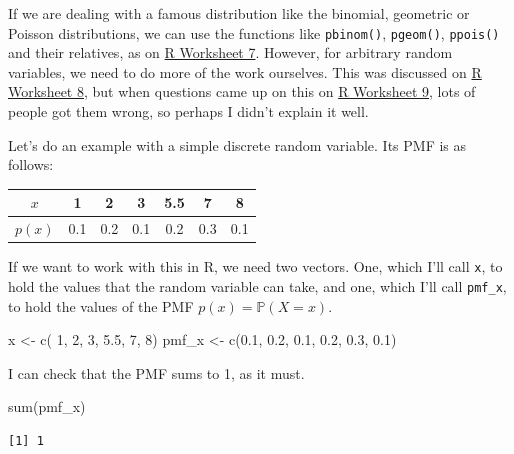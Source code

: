 \documentclass[
  letterpaper,
  DIV=11,
  numbers=noendperiod]{scrreprt}
\newenvironment{Shaded}{\begin{snugshade}}{\end{snugshade}}
\newcommand{\DecValTok}[1]{\textcolor[rgb]{0.68,0.00,0.00}{#1}}
\newcommand{\FloatTok}[1]{\textcolor[rgb]{0.68,0.00,0.00}{#1}}
\newcommand{\FunctionTok}[1]{\textcolor[rgb]{0.28,0.35,0.67}{#1}}
\newcommand{\NormalTok}[1]{\textcolor[rgb]{0.00,0.23,0.31}{#1}}
\newcommand{\OtherTok}[1]{\textcolor[rgb]{0.00,0.23,0.31}{#1}}
\theoremstyle{remark}
\begin{document}
If we are dealing with a famous distribution like the binomial,
geometric or Poisson distributions, we can use the functions like
\texttt{pbinom()}, \texttt{pgeom()}, \texttt{ppois()} and their
relatives, as on \protect\hyperlink{R}{R Worksheet 7}. However, for
arbitrary random variables, we need to do more of the work ourselves.
This was discussed on \protect\hyperlink{R}{R Worksheet 8}, but when
questions came up on this on \protect\hyperlink{R}{R Worksheet 9}, lots
of people got them wrong, so perhaps I didn't explain it well.

Let's do an example with a simple discrete random variable. Its PMF is
as follows:

\begin{longtable}[]{@{}ccccccc@{}}
\toprule()
\(x\) & 1 & 2 & 3 & 5.5 & 7 & 8 \\
\midrule()
\endhead
\(p(x)\) & 0.1 & 0.2 & 0.1 & 0.2 & 0.3 & 0.1 \\
\bottomrule()
\end{longtable}

If we want to work with this in R, we need two vectors. One, which I'll
call \texttt{x}, to hold the values that the random variable can take,
and one, which I'll call \texttt{pmf\_x}, to hold the values of the PMF
\(p(x) = \mathbb P(X = x)\).

\begin{Shaded}
\begin{Highlighting}[]
\NormalTok{x     }\OtherTok{\textless{}{-}} \FunctionTok{c}\NormalTok{(  }\DecValTok{1}\NormalTok{,   }\DecValTok{2}\NormalTok{,   }\DecValTok{3}\NormalTok{, }\FloatTok{5.5}\NormalTok{,   }\DecValTok{7}\NormalTok{,   }\DecValTok{8}\NormalTok{)}
\NormalTok{pmf\_x }\OtherTok{\textless{}{-}} \FunctionTok{c}\NormalTok{(}\FloatTok{0.1}\NormalTok{, }\FloatTok{0.2}\NormalTok{, }\FloatTok{0.1}\NormalTok{, }\FloatTok{0.2}\NormalTok{, }\FloatTok{0.3}\NormalTok{, }\FloatTok{0.1}\NormalTok{)}
\end{Highlighting}
\end{Shaded}

I can check that the PMF sums to 1, as it must.

\begin{Shaded}
\begin{Highlighting}[]
\FunctionTok{sum}\NormalTok{(pmf\_x)}
\end{Highlighting}
\end{Shaded}

\begin{verbatim}
[1] 1
\end{verbatim}
\end{document}
